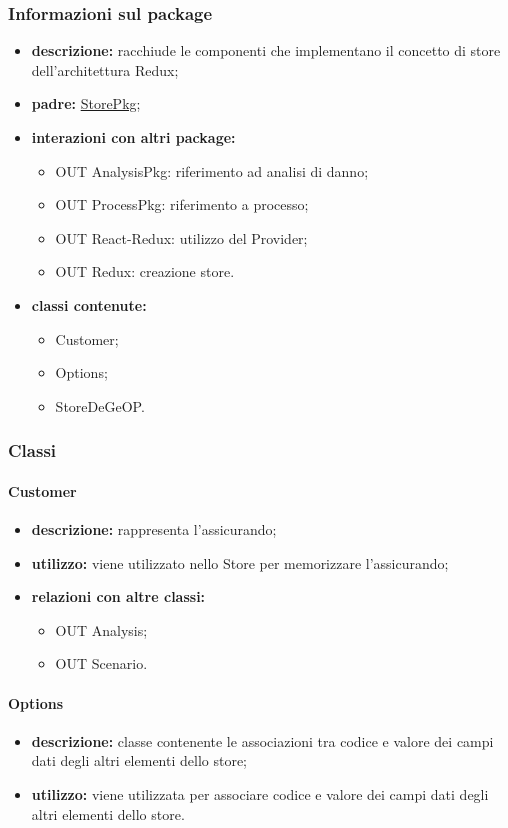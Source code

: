 \subsubsection{Informazioni sul package}
\begin{itemize}
	\item \textbf{descrizione:} racchiude le componenti che implementano il concetto di store dell'architettura Redux;
	\item \textbf{padre:} \hyperref[pkg::StorePkg]{StorePkg};
	\item \textbf{interazioni con altri package:} 
	\begin{itemize}
		\item OUT AnalysisPkg: riferimento ad analisi di danno;
		\item OUT ProcessPkg: riferimento a processo;
		\item OUT React-Redux: utilizzo del Provider;
		\item OUT Redux: creazione store.
	\end{itemize}
	\item \textbf{classi contenute:}
	\begin{itemize}
		\item Customer;
		\item Options;
		\item StoreDeGeOP.
	\end{itemize}
\end{itemize}
\subsubsection{Classi}
\paragraph{Customer}
\begin{itemize}
	\item \textbf{descrizione:} rappresenta l'assicurando;
	\item \textbf{utilizzo:} viene utilizzato nello Store per memorizzare l'assicurando;
	\item \textbf{relazioni con altre classi:} 
	\begin{itemize}
		\item OUT Analysis;
		\item OUT Scenario.
	\end{itemize}
\end{itemize}
\paragraph{Options}
\begin{itemize}
	\item \textbf{descrizione:} classe contenente le associazioni tra codice e valore dei campi dati degli altri elementi dello store;
	\item \textbf{utilizzo:} viene utilizzata per associare codice e valore dei campi dati degli altri elementi dello store.
\end{itemize}
